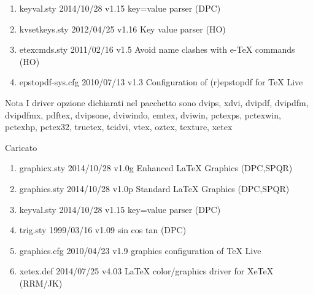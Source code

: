 \begin{enumerate}
\item keyval.sty 2014/10/28 v1.15 key=value parser (DPC)
\item kvsetkeys.sty 2012/04/25 v1.16 Key value parser (HO)
\item etexcmds.sty 2011/02/16 v1.5 Avoid name clashes with e-TeX commands (HO)
\item epstopdf-sys.cfg 2010/07/13 v1.3 Configuration of (r)epstopdf for TeX Live 
\end{enumerate} 
Nota I driver opzione dichiarati nel pacchetto sono dvips, xdvi, dvipdf, dvipdfm, dvipdfmx, pdftex, dvipsone, dviwindo, emtex, dviwin, pctexps, pctexwin, pctexhp, pctex32, truetex, tcidvi, vtex, oztex, texture, xetex

Caricato 
\begin{enumerate}
 \item graphicx.sty 2014/10/28 v1.0g Enhanced LaTeX Graphics (DPC,SPQR)
 \item graphics.sty 2014/10/28 v1.0p Standard LaTeX Graphics (DPC,SPQR)
 \item keyval.sty 2014/10/28 v1.15 key=value parser (DPC)
 \item trig.sty 1999/03/16 v1.09 sin cos tan (DPC)
 \item graphics.cfg 2010/04/23 v1.9 graphics configuration of TeX Live
\item xetex.def 2014/07/25 v4.03 LaTeX color/graphics driver for XeTeX (RRM/JK)
\end{enumerate} 
